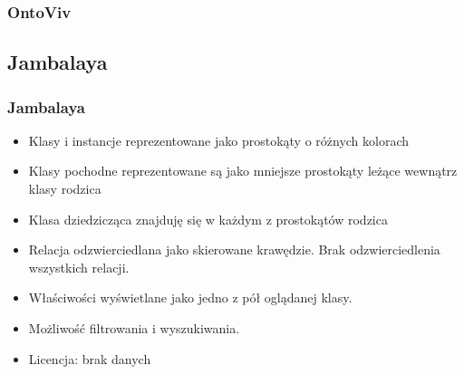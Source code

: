 \documentclass{beamer}
\begin{document}
\begin{frame}
  \frametitle{OntoViv}
\begin{center}
\end{center}
\end{frame}

\subsection{Jambalaya}
\begin{frame}
  \frametitle{Jambalaya}

  \begin{itemize}
    \item Klasy i instancje reprezentowane jako prostokąty o różnych kolorach
    \item Klasy pochodne reprezentowane są jako mniejsze prostokąty leżące wewnątrz  klasy rodzica
    \item Klasa dziedzicząca znajduję się w każdym  z prostokątów rodzica
    \item Relacja odzwierciedlana jako skierowane krawędzie. Brak odzwierciedlenia wszystkich relacji.
    \item Właściwości wyświetlane jako jedno z pół oglądanej klasy.
    \item Możliwość filtrowania i wyszukiwania.
    \item Licencja: brak danych
  \end{itemize}

\end{frame}
\end{document}
